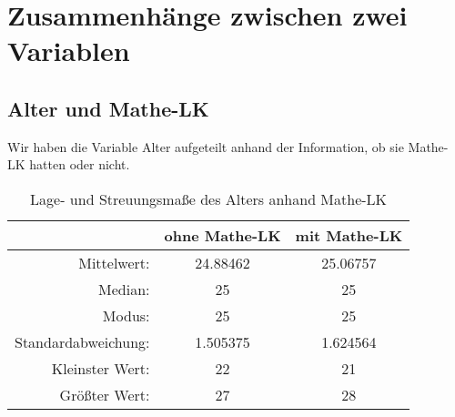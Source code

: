 \documentclass[paper=a4,                 %
               fontsize=12pt,            %
               parskip=half,             %
               ngerman,                 %
               ]{scrartcl}
\begin{document}
\newpage
\section{Zusammenhänge zwischen zwei Variablen}
\subsection{Alter und Mathe-LK}
Wir haben die Variable Alter aufgeteilt anhand der Information, ob sie Mathe-LK hatten oder nicht. \newline
\begin{table}[h]
\begin{center}
\begin{tabular}{r|c|c}
& ohne Mathe-LK & mit Mathe-LK \\
\hline
Mittelwert: & 24.88462 & 25.06757 \\
Median:  & 25 & 25 \\
Modus: &  25 & 25\\
Standardabweichung: & 1.505375 & 1.624564\\
Kleinster Wert: & 22 & 21\\
Größter Wert: & 27 & 28\\
\end{tabular}
\caption{Lage- und Streuungsmaße des Alters anhand Mathe-LK}
\end{center}
\end{table}

\newpage
\end{document}
